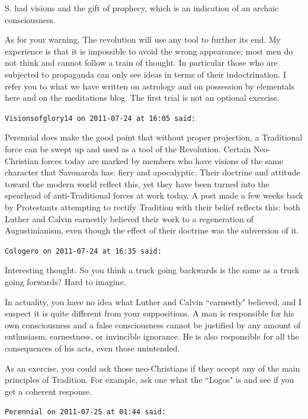 \begin{footnotesize}
\begin{sffamily}
S. had visions and the gift of prophecy, which is an indication of an archaic consciousness.

As for your warning. The revolution will use any tool to further its end. My experience is that it is impossible to avoid the wrong appearance; most men do not think and cannot follow a train of thought. In particular those who are subjected to propaganda can only see ideas in terms of their indoctrination. I refer you to what we have written on astrology and on possession by elementals here and on the meditations blog. The first trial is not an optional exercise.


\hfill

\texttt{Visionsofglory14 on 2011-07-24 at 16:05 said: }

Perennial does make the good point that without proper projection, a Traditional force can be swept up and used as a tool of the Revolution. Certain Neo-Christian forces today are marked by members who have visions of the same character that Savonarola has: fiery and apocalyptic. Their doctrine and attitude toward the modern world reflect this, yet they have been turned into the spearhead of anti-Traditional forces at work today. A post made a few weeks back by Protestants attempting to rectify Tradition with their belief reflects this: both Luther and Calvin earnestly believed their work to a regeneration of Augustinianism, even though the effect of their doctrine was the subversion of it.


\hfill

\texttt{Cologero on 2011-07-24 at 16:35 said: }

Interesting thought. So you think a truck going backwards is the same as a truck going forwards? Hard to imagine.

In actuality, you have no idea what Luther and Calvin ``earnestly" believed, and I suspect it is quite different from your suppositions. A man is responsible for his own consciousness and a false consciousness cannot be justified by any amount of enthusiasm, earnestness, or invincible ignorance. He is also responsible for all the consequences of his acts, even those unintended.

As an exercise, you could ask those neo-Christians if they accept any of the main principles of Tradition. For example, ask one what the ``Logos" is and see if you get a coherent response.


\hfill

\texttt{Perennial on 2011-07-25 at 01:44 said: }


\end{sffamily}
\end{footnotesize}
